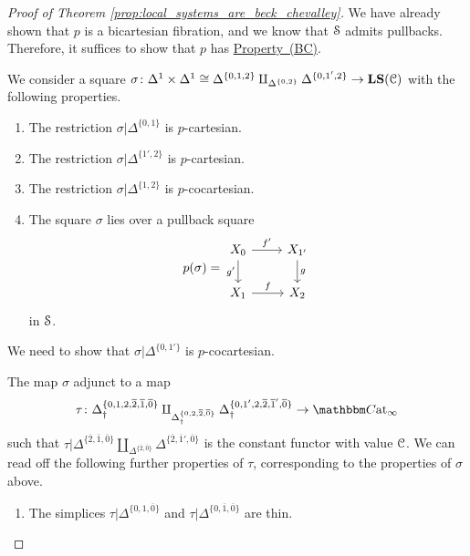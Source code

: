 \documentclass[main.tex]{subfiles}
\begin{document}
\begin{proof}[Proof of Theorem \ref{prop:local_systems_are_beck_chevalley}]
  We have already shown that $p$ is a bicartesian fibration, and we know that $\S$ admits pullbacks. Therefore, it suffices to show that $p$ has \hyperref[item:beck_chevalley_condition]{Property~(BC)}.

  We consider a square $\sigma\colon \Delta^{1} \times \Delta^{1} \cong \Delta^{\{0,1,2\}} \amalg_{\Delta^{\{0,2\}}}\Delta^{\{0,1',2\}} \to \LS(\category{C})$ with the following properties.
  \begin{enumerate}
    \item The restriction $\sigma|\Delta^{\{0,1\}}$ is $p$-cartesian.

    \item The restriction $\sigma|\Delta^{\{1',2\}}$ is $p$-cartesian.

    \item The restriction $\sigma|\Delta^{\{1,2\}}$ is $p$-cocartesian.

    \item The square $\sigma$ lies over a pullback square
      \begin{equation*}
        p(\sigma) =
        \begin{tikzcd}
          X_{0}
          \arrow[r, "f'"]
          \arrow[d, swap, "g'"]
          & X_{1'}
          \arrow[d, "g"]
          \\
          X_{1}
          \arrow[r, "f"]
          & X_{2}
        \end{tikzcd}
      \end{equation*}
      in $\S$.
  \end{enumerate}
  We need to show that $\sigma|\Delta^{\{0,1'\}}$ is $p$-cocartesian.

  The map $\sigma$ adjunct to a map
  \begin{equation*}
    \tau\colon \Delta^{\{0,1,2,\overline{2}, \overline{1}, \overline{0}\}}_{\dagger}\amalg_{\Delta^{\{0,2,\overline{2}, \overline{0}\}}_{\dagger}} \Delta^{\{0,1',2,\overline{2}, \overline{1}', \overline{0}\}}_{\dagger} \to \ICCat
  \end{equation*}
  such that $\tau|\Delta^{\{\overline{2}, \overline{1}, \overline{0}\}} \amalg_{\Delta^{\{\overline{2},\overline{0}\}}} \Delta^{\{\overline{2}, \overline{1}', \overline{0}\}}$ is the constant functor with value $\category{C}$. We can read off the following further properties of $\tau$, corresponding to the properties of $\sigma$ above.
  \begin{enumerate}
    \item The simplices $\tau|\Delta^{\{0,1,\overline{0}\}}$ and $\tau|\Delta^{\{0,\overline{1},\overline{0}\}}$ are thin.


\end{enumerate}
\end{proof}
\end{document}
